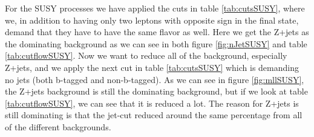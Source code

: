For the SUSY processes we have applied the cuts in table \ref{tab:cutsSUSY}, where we, in addition to having only two leptons with opposite sign in the final state, demand that they have to have the same flavor as well. Here we get the Z+jets as the dominating background as we can see in both figure \ref{fig:nJetSUSY} and table \ref{tab:cutflowSUSY}. Now we want to reduce all of the background, especially Z+jets, and we apply the next cut in table \ref{tab:cutsSUSY} which is demanding no jets (both b-tagged and non-b-tagged). As we can see in figure \ref{fig:mllSUSY}, the Z+jets background is still the dominating background, but if we look at table \ref{tab:cutflowSUSY}, we can see that it is reduced a lot. The reason for Z+jets is still dominating is that the jet-cut reduced around the same percentage from all of the different backgrounds. 

